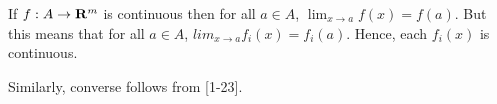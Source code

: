 
\begin{solution}
    If $f:A \to \mathbf{R}^m$ is continuous then for
    all $a\in A$, $\lim_{x\to a}{f(x)}=f(a)$.
    But this means that for all $a\in A$,
    $lim_{x\to a}{f_i(x)} =f_i(a)$. Hence,
    each $f_i(x)$ is continuous.

    Similarly, converse follows from [1-23].
\end{solution}